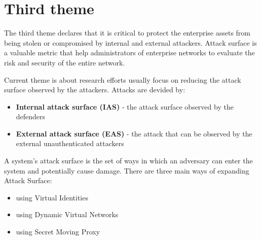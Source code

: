 \documentclass[10pt,a4paper]{article}
\begin{document}
\section{Third theme}

The third theme declares that it is critical to protect the enterprise assets from being stolen or compromised by internal and external attackers. Attack surface is a valuable metric that help administrators of enterprise networks to evaluate the risk and security of the entire network. 

Current theme is about research efforts usually focus on reducing the attack surface observed by the attackers. Attacks are devided by:
\begin{itemize}
	\item \textbf{Internal attack surface (IAS)} - the attack surface observed by the defenders
	\item \textbf{External attack surface (EAS)} - the attack that can be observed by the external unauthenticated attackers
\end{itemize}

A system’s attack surface is the set of ways in which an adversary can enter the system and potentially cause damage. There are three main ways of
expanding Attack Surface:
\begin{itemize}
	\item using Virtual Identities
	\item using Dynamic Virtual Networks
	\item using Secret Moving Proxy
\end{itemize}
\end{document}
